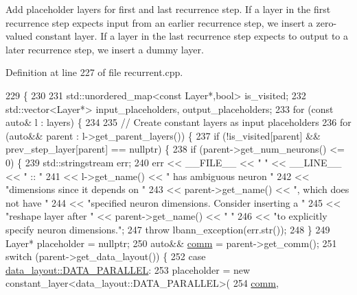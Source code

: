 Add placeholder layers for first and last recurrence step. If a layer in the first recurrence step expects input from an earlier recurrence step, we insert a zero-\/valued constant layer. If a layer in the last recurrence step expects to output to a later recurrence step, we insert a dummy layer. 

Definition at line 227 of file recurrent.\+cpp.


\begin{DoxyCode}
229                                                                                     \{
230 
231   std::unordered\_map<const Layer*,bool> is\_visited;
232   std::vector<Layer*> input\_placeholders, output\_placeholders;
233   \textcolor{keywordflow}{for} (\textcolor{keyword}{const} \textcolor{keyword}{auto}& l : layers) \{
234 
235     \textcolor{comment}{// Create constant layers as input placeholders}
236     \textcolor{keywordflow}{for} (\textcolor{keyword}{auto}&& parent : l->get\_parent\_layers()) \{
237       \textcolor{keywordflow}{if} (!is\_visited[parent] && prev\_step\_layer[parent] == \textcolor{keyword}{nullptr}) \{
238         \textcolor{keywordflow}{if} (parent->get\_num\_neurons() <= 0) \{
239           std::stringstream err;
240           err << \_\_FILE\_\_ << \textcolor{stringliteral}{" "} << \_\_LINE\_\_ << \textcolor{stringliteral}{" :: "}
241               << l->get\_name() << \textcolor{stringliteral}{" has ambiguous neuron "}
242               << \textcolor{stringliteral}{"dimensions since it depends on "}
243               << parent->get\_name() << \textcolor{stringliteral}{", which does not have "}
244               << \textcolor{stringliteral}{"specified neuron dimensions. Consider inserting a "}
245               << \textcolor{stringliteral}{"reshape layer after "} << parent->get\_name() << \textcolor{stringliteral}{" "}
246               << \textcolor{stringliteral}{"to explicitly specify neuron dimensions."};
247           \textcolor{keywordflow}{throw} lbann\_exception(err.str());
248         \}
249         Layer* placeholder = \textcolor{keyword}{nullptr};
250         \textcolor{keyword}{auto}&& \hyperlink{file__io_8cpp_ab048c6f9fcbcfaa57ce68b00263dbebe}{comm} = parent->get\_comm();
251         \textcolor{keywordflow}{switch} (parent->get\_data\_layout()) \{
252         \textcolor{keywordflow}{case} \hyperlink{base_8hpp_a786677cbfb3f5677b4d84f3056eb08dba37d2a3465f7cbf4ab60f4e79944d0638}{data\_layout::DATA\_PARALLEL}:
253           placeholder = \textcolor{keyword}{new} constant\_layer<data\_layout::DATA\_PARALLEL>(
254                               \hyperlink{file__io_8cpp_ab048c6f9fcbcfaa57ce68b00263dbebe}{comm},

\end{DoxyCode}
